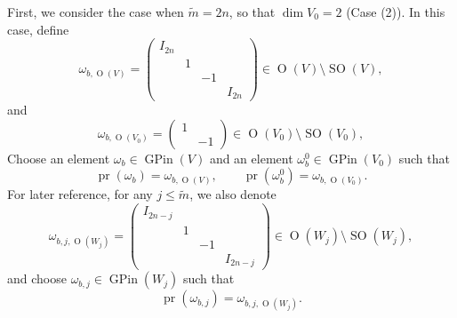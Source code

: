 \documentclass[12pt]{amsart}
\theoremstyle{remark}
\newcommand{\pr}{\operatorname{pr}}
\DeclareMathOperator{\SO}{SO}
\DeclareMathOperator{\GPin}{GPin}
\DeclareMathOperator{\Orth}{O}
\begin{document}
First, we consider the case when $\widetilde{m}=2n$, so that $\dim V_0=2$ (Case (2)). In this case, define
\begin{equation*}
\omega_{b,\Orth(V)}= \left(\begin{smallmatrix}I_{2n} & & &\\&1&&\\&&-1&\\&&&I_{2n}  \end{smallmatrix} \right) \in \Orth(V)\setminus \SO(V),	
\end{equation*}
and 
\begin{equation*}
\omega_{b,\Orth(V_0)}= \left(\begin{smallmatrix}1 & \\ & -1  \end{smallmatrix} \right) \in \Orth(V_0)\setminus \SO(V_0),	
\end{equation*}
Choose an element $\omega_b\in \GPin(V)$ and an element $\omega_{b}^0\in \GPin(V_0)$ such that 
\begin{equation*}
\pr(\omega_b)=\omega_{b,\Orth(V)}, \qquad \pr(\omega_b^0)=\omega_{b,\Orth(V_0)}.	
\end{equation*}
For later reference, for any $j\le \widetilde{m}$, we also denote
\begin{equation*}
\omega_{b,j,\Orth(W_j)}=	\left(\begin{smallmatrix}I_{2n-j} & & &\\&1&&\\&&-1&\\&&&I_{2n-j}  \end{smallmatrix} \right)\in \Orth(W_j)\setminus \SO(W_j),
\end{equation*}
and choose $\omega_{b,j}\in \GPin(W_j)$ such that 
\begin{equation}
\label{eq-omega_b,j-1}
\pr(\omega_{b,j})=\omega_{b,j,\Orth(W_j)}.	
\end{equation}
\end{document}
